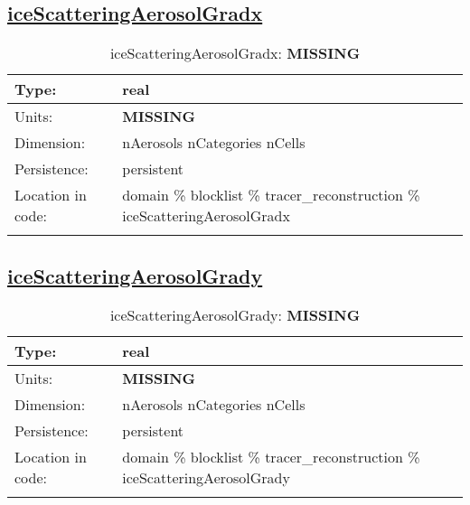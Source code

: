 \subsection[iceScatteringAerosolGradx]{\hyperref[sec:var_tab_tracer_reconstruction]{iceScatteringAerosolGradx}}
\label{subsec:var_sec_tracer_reconstruction_iceScatteringAerosolGradx}
\begin{center}
\begin{longtable}{| p{2.0in} | p{4.0in} |}
        \hline 
        Type: & real \\
        \hline 
        Units: & {\bf \color{red} MISSING} \\
        \hline 
        Dimension: & nAerosols nCategories nCells \\
        \hline 
        Persistence: & persistent \\
        \hline 
         Location in code: & domain \% blocklist \% tracer\_reconstruction \% iceScatteringAerosolGradx \\
         \hline 
    \caption{iceScatteringAerosolGradx: {\bf \color{red} MISSING}}
\end{longtable}
\end{center}
\subsection[iceScatteringAerosolGrady]{\hyperref[sec:var_tab_tracer_reconstruction]{iceScatteringAerosolGrady}}
\label{subsec:var_sec_tracer_reconstruction_iceScatteringAerosolGrady}
\begin{center}
\begin{longtable}{| p{2.0in} | p{4.0in} |}
        \hline 
        Type: & real \\
        \hline 
        Units: & {\bf \color{red} MISSING} \\
        \hline 
        Dimension: & nAerosols nCategories nCells \\
        \hline 
        Persistence: & persistent \\
        \hline 
         Location in code: & domain \% blocklist \% tracer\_reconstruction \% iceScatteringAerosolGrady \\
         \hline 
    \caption{iceScatteringAerosolGrady: {\bf \color{red} MISSING}}
\end{longtable}
\end{center}
